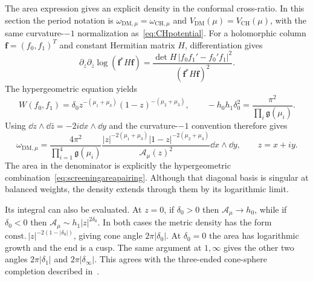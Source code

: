 The area expression gives an explicit density in the conformal
cross-ratio. In this section the period notation is
$\omega_{\mathrm{DM},\mu}=\omega_{\mathrm{CH},\mu}$ and
$V_{\mathrm{DM}}(\mu)=V_{\mathrm{CH}}(\mu)$, with the same
curvature-$-1$ normalization as~\eqref{eq:CHpotential}.
For a holomorphic column $\boldsymbol f=(f_0,f_1)^T$
and constant Hermitian matrix $H$, differentiation gives
\begin{equation}
 \partial_z\partial_{\bar z}\log(\boldsymbol f^*H\boldsymbol f)
 =\frac{\det H\,|f_0f_1'-f_0'f_1|^2}
        {(\boldsymbol f^*H\boldsymbol f)^2}.
 \label{eq:HermitianWronskian}
\end{equation}
The hypergeometric equation yields
\begin{equation}
 W(f_0,f_1)=\delta_0
      z^{-(\mu_1+\mu_3)}(1-z)^{-(\mu_2+\mu_3)},
 \qquad
 -h_0h_1\delta_0^2
       =\frac{\pi^2}{\prod_i\mathfrak g(\mu_i)}.
 \label{eq:screeningWronskian}
\end{equation}
Using $\dd z\wedge\dd\bar z=-2i\dd x\wedge\dd y$ and
the curvature-$-1$ convention therefore gives
\begin{equation}
 \boxed{\quad
 \omega_{\mathrm{DM},\mu}
 =\frac{4\pi^2}{\prod_{i=1}^4\mathfrak g(\mu_i)}
  \frac{|z|^{-2(\mu_1+\mu_3)}
        |1-z|^{-2(\mu_2+\mu_3)}}{\mathcal A_\mu(z)^2}
       \dd x\wedge\dd y,\qquad z=x+iy.
 \quad}
 \label{eq:general4DMdensity}
\end{equation}
The area in the denominator is explicitly the hypergeometric
combination~\eqref{eq:screeningareapairing}. Although that
diagonal basis is singular at balanced weights, the density
extends through them by its logarithmic limit.

Its integral can also be evaluated. At $z=0$, if $\delta_0>0$
then $\mathcal A_\mu\to h_0$, while if $\delta_0<0$ then
$\mathcal A_\mu\sim h_1|z|^{2\delta_0}$. In both cases
the metric density has the form
$\text{const.}\,|z|^{-2(1-|\delta_0|)}$, giving cone
angle $2\pi|\delta_0|$. At $\delta_0=0$ the area has
logarithmic growth and the end is a cusp. The same argument
at $1,\infty$ gives the other two angles
$2\pi|\delta_1|$ and $2\pi|\delta_\infty|$.
This agrees with the three-ended cone-sphere completion
described in~\cite[Section~5]{Kojima}.

